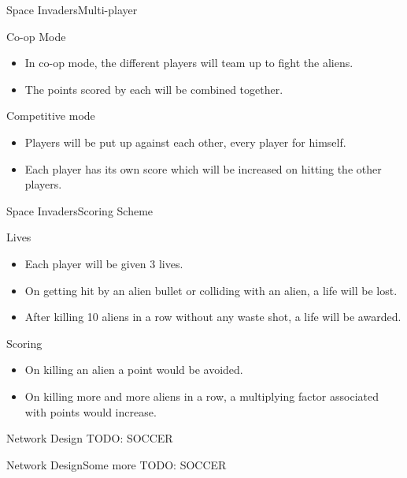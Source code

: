 \documentclass{beamer}
\begin{document}
\begin{frame}{Space Invaders}{Multi-player}
	\begin{block}{Co-op Mode}
	\begin{itemize}
		\item In co-op mode, the different players will team up to fight the aliens.
		\item The points scored by each will be combined together.
	\end{itemize}
	\end{block}
	\begin{block}{Competitive mode}
	\begin{itemize}
		\item Players will be put up against each other, every player for himself. 
		\item Each player has its own score which will be increased on hitting the other players.
	\end{itemize}  
	\end{block}
\end{frame}

\begin{frame}{Space Invaders}{Scoring Scheme}
	\begin{block}{Lives}
		\begin{itemize}
			\item Each player will be given 3 lives.
			\item On getting hit by an alien bullet or colliding with an alien, a life will be lost.
			\item After killing 10 aliens in a row without any waste shot, a life will be awarded.
		\end{itemize}
	\end{block}
	
	\begin{block}{Scoring}
		\begin{itemize}
			\item On killing an alien a point would be avoided.
			\item On killing more and more aliens in a row, a multiplying factor associated with points would increase.
		\end{itemize}
	\end{block}
\end{frame}


\begin{frame}{Network Design}{}
	TODO: SOCCER
\end{frame}

\begin{frame}{Network Design}{Some more}
	TODO: SOCCER
\end{frame}
\end{document}
